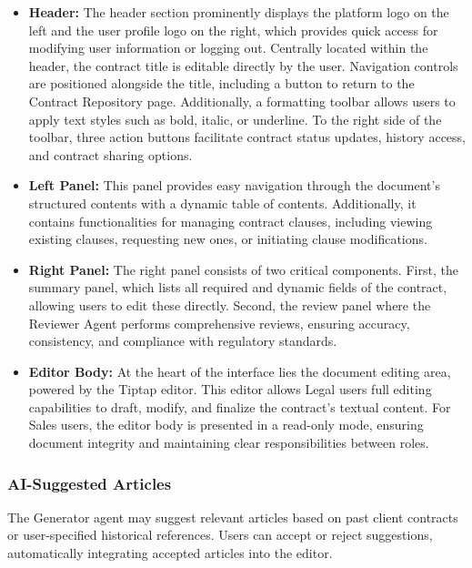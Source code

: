 \begin{itemize}
    \item \textbf{Header:} The header section prominently displays the platform logo on the left and the user profile logo on the right, which provides quick access for modifying user information or logging out. Centrally located within the header, the contract title is editable directly by the user. Navigation controls are positioned alongside the title, including a button to return to the Contract Repository page. Additionally, a formatting toolbar allows users to apply text styles such as bold, italic, or underline. To the right side of the toolbar, three action buttons facilitate contract status updates, history access, and contract sharing options.
    \item \textbf{Left Panel:} This panel provides easy navigation through the document's structured contents with a dynamic table of contents. Additionally, it contains functionalities for managing contract clauses, including viewing existing clauses, requesting new ones, or initiating clause modifications.
    \item \textbf{Right Panel:} The right panel consists of two critical components. First, the summary panel, which lists all required and dynamic fields of the contract, allowing users to edit these directly. Second, the review panel where the Reviewer Agent performs comprehensive reviews, ensuring accuracy, consistency, and compliance with regulatory standards.
    \item \textbf{Editor Body:} At the heart of the interface lies the document editing area, powered by the Tiptap editor. This editor allows Legal users full editing capabilities to draft, modify, and finalize the contract's textual content. For Sales users, the editor body is presented in a read-only mode, ensuring document integrity and maintaining clear responsibilities between roles.
\end{itemize}

\subsubsection{AI-Suggested Articles}
The Generator agent may suggest relevant articles based on past client contracts or user-specified historical references. Users can accept or reject suggestions, automatically integrating accepted articles into the editor.

